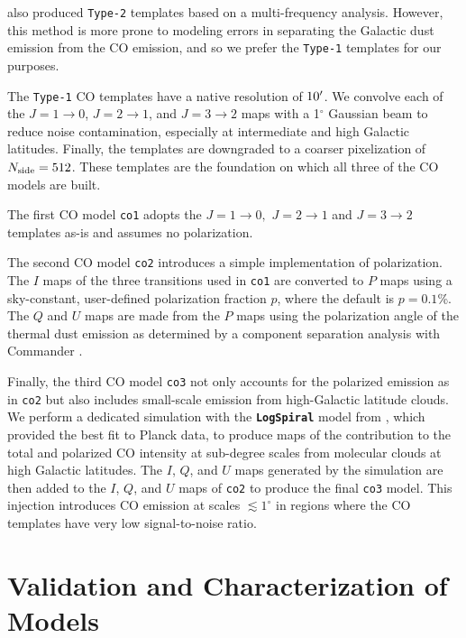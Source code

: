 \documentclass[twocolumn]{aastex631}
\begin{document}
\citet{planck2013-p03a} also produced \texttt{Type-2} templates based on a multi-frequency analysis. However, this method is more prone to modeling errors in separating the Galactic dust emission from the CO emission, and so we prefer the \texttt{Type-1} templates for our purposes.

The \texttt{Type-1} CO templates have a native resolution of $10\mbox{$^\prime$}$. We convolve each of the $J = 1\rightarrow0$, $J = 2\rightarrow1$, and $J = 3\rightarrow2$ maps with a 1$^\circ$ Gaussian beam to reduce noise contamination, especially at intermediate and high Galactic latitudes. Finally, the templates are downgraded to a coarser pixelization of $N_{\rm side} = 512$. These templates are the foundation on which all three of the CO models are built.

The first CO model \texttt{co1} adopts the $J = 1\rightarrow0,$  $J = 2\rightarrow1$ and $J = 3\rightarrow2$ templates as-is and assumes no polarization. 

The second CO model \texttt{co2} introduces a simple implementation of polarization. The $I$ maps of the three transitions used in \texttt{co1} are converted to $P$ maps using a sky-constant, user-defined polarization fraction $p$, where the default is $p = 0.1$\%. The $Q$ and $U$ maps are made from the $P$ maps using the polarization angle of the thermal dust emission as determined by a component separation analysis with Commander \citep{planck2014-a12}.

Finally, the third CO model \texttt{co3} not only accounts for the polarized emission as in \texttt{co2} but also includes small-scale emission from high-Galactic latitude clouds. We perform a dedicated simulation with the {\bf\texttt{LogSpiral}} model from \citet{Puglisi:2017}, which provided the best fit to Planck data, to produce maps of the contribution to the total and polarized CO intensity at sub-degree scales from molecular clouds at high Galactic latitudes. The $I$, $Q$, and $U$ maps generated by the simulation are then added to the $I$, $Q$, and $U$ maps of \texttt{co2} to produce the final \texttt{co3} model. This injection introduces CO emission at scales $\lesssim1^\circ$ in regions where the CO templates have very low signal-to-noise ratio. 
 
\section{Validation and Characterization of Models} \label{sec:validation}
\end{document}
